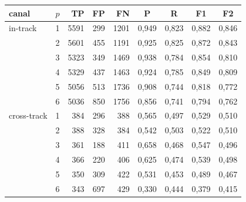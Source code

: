 \begin{tabular}{llrrrcccc}
\toprule
canal & $p$ & TP & FP & FN & P & R & F1 & F2 \\
\midrule
in-track & 1 & 5591 & 299 & 1201 & 0,949 & 0,823 & 0,882 & 0,846 \\
 & 2 & 5601 & 455 & 1191 & 0,925 & 0,825 & 0,872 & 0,843 \\
 & 3 & 5323 & 349 & 1469 & 0,938 & 0,784 & 0,854 & 0,810 \\
 & 4 & 5329 & 437 & 1463 & 0,924 & 0,785 & 0,849 & 0,809 \\
 & 5 & 5056 & 513 & 1736 & 0,908 & 0,744 & 0,818 & 0,772 \\
 & 6 & 5036 & 850 & 1756 & 0,856 & 0,741 & 0,794 & 0,762 \\
\midrule
cross-track & 1 & 384 & 296 & 388 & 0,565 & 0,497 & 0,529 & 0,510 \\
 & 2 & 388 & 328 & 384 & 0,542 & 0,503 & 0,522 & 0,510 \\
 & 3 & 361 & 188 & 411 & 0,658 & 0,468 & 0,547 & 0,496 \\
 & 4 & 366 & 220 & 406 & 0,625 & 0,474 & 0,539 & 0,498 \\
 & 5 & 350 & 309 & 422 & 0,531 & 0,453 & 0,489 & 0,467 \\
 & 6 & 343 & 697 & 429 & 0,330 & 0,444 & 0,379 & 0,415 \\
\bottomrule
\end{tabular}
